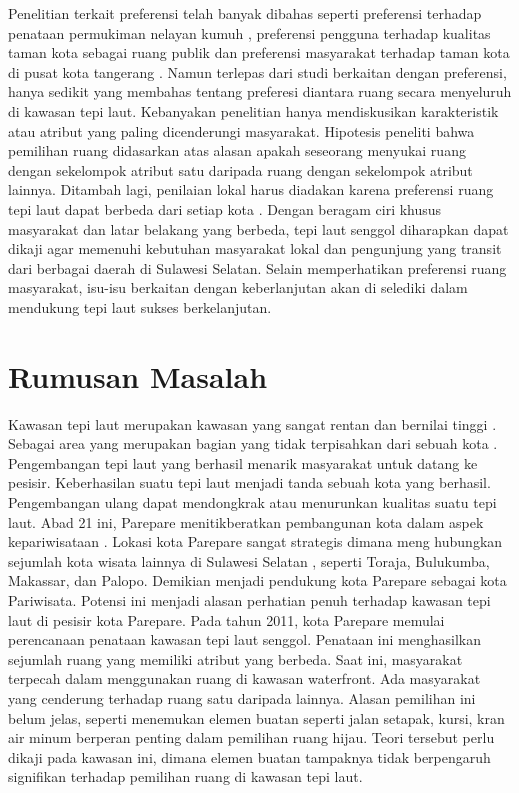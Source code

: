 \documentclass[12pt,oneside]{udthesis}
\begin{document}
Penelitian terkait preferensi telah banyak dibahas seperti preferensi terhadap penataan permukiman nelayan kumuh \citep{ramdani2013}, preferensi pengguna terhadap kualitas taman kota sebagai ruang publik \citep{pratomo2017} dan  preferensi masyarakat terhadap taman kota di pusat kota tangerang \citep{imansari2015}.
Namun terlepas dari studi berkaitan dengan preferensi, hanya sedikit yang membahas tentang preferesi diantara ruang secara menyeluruh di kawasan tepi laut.
Kebanyakan penelitian hanya mendiskusikan karakteristik atau atribut yang paling dicenderungi masyarakat. Hipotesis peneliti bahwa pemilihan ruang didasarkan atas alasan apakah seseorang menyukai ruang dengan sekelompok atribut satu daripada ruang dengan sekelompok atribut lainnya.
Ditambah lagi, penilaian lokal harus diadakan karena preferensi ruang tepi laut dapat berbeda dari setiap kota \citep{madureira2018}.
Dengan beragam ciri khusus masyarakat dan latar belakang yang berbeda, tepi laut senggol diharapkan dapat dikaji agar memenuhi kebutuhan masyarakat lokal dan pengunjung yang transit dari berbagai daerah di Sulawesi Selatan.
Selain memperhatikan preferensi ruang masyarakat, isu-isu berkaitan dengan keberlanjutan akan di selediki dalam mendukung tepi laut sukses berkelanjutan.


\section{Rumusan Masalah}
Kawasan tepi laut merupakan kawasan yang sangat rentan dan bernilai tinggi \citep{mullin2000}. Sebagai area yang merupakan bagian yang tidak terpisahkan dari sebuah kota \citep{hussein2014}. Pengembangan tepi laut yang berhasil menarik masyarakat untuk datang ke pesisir. Keberhasilan suatu tepi laut menjadi tanda sebuah kota yang berhasil.
Pengembangan ulang dapat mendongkrak atau menurunkan kualitas suatu tepi laut. Abad 21 ini, Parepare menitikberatkan pembangunan kota dalam aspek kepariwisataan \citep{junaid2016,faniapriani2018,muh.sainals2020} . Lokasi kota Parepare sangat strategis dimana meng­ hubungkan sejumlah kota wisata lainnya di Sulawesi Selatan \citep{junaid2016}, seperti Toraja, Bulukumba, Makassar, dan Palopo. Demikian menjadi pendukung kota Parepare sebagai kota Pariwisata. Potensi ini menjadi alasan perhatian penuh terhadap kawasan tepi laut di pesisir kota Parepare.
Pada tahun 2011, kota Parepare memulai perencanaan penataan kawasan tepi laut senggol. Penataan ini menghasilkan sejumlah ruang yang memiliki atribut yang berbeda. Saat ini, masyarakat terpecah dalam menggunakan ruang di kawasan waterfront. Ada masyarakat yang cenderung terhadap ruang satu daripada lainnya. Alasan pemilihan ini belum jelas, seperti \cite{campagnaro2020} menemukan elemen buatan seperti jalan setapak, kursi, kran air minum berperan penting dalam pemilihan ruang hijau. Teori tersebut perlu dikaji pada kawasan ini, dimana elemen buatan tampaknya tidak berpengaruh signifikan terhadap pemilihan ruang di kawasan tepi laut.
\end{document}
